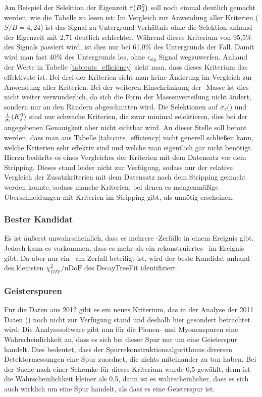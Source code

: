 Am Beispiel der Selektion der Eigenzeit $\tau(\text{$B_d^0$})$ soll noch einmal deutlich gemacht werden, wie die Tabelle zu lesen ist: Im Vergleich zur Anwendung aller Kriterien ($S/B=4,24$) ist das Signal-zu-Untergrund-Verhältnis ohne die Selektion anhand der Eigenzeit mit 2,71 deutlich schlechter. Während dieses Kriterium von 95,5\% des Signals passiert wird, ist dies nur bei 61,0\% des Untergrunds der Fall. Damit wird man fast 40\% des Untergrunds los, ohne $\epsilon_{\text{sig}}$ Signal wegzuwerfen. Anhand der Werte in Tabelle \ref{tab:cuts_efficiency} sieht man, dass dieses Kriterium das effektivste ist. Bei drei der Kriterien sieht man keine Änderung im Vergleich zur Anwendung aller Kriterien. Bei der weiteren Einschränkung der \Bd-Masse ist dies nicht weiter verwunderlich, da sich die Form der Massenverteilung nicht ändert, sondern nur an den Rändern abgeschnitten wird. Die Selektionen auf $\sigma_\tau($\Bd$)$ und $\frac{l}{\sigma_l}(K_s^0)$ sind nur schwache Kriterien, die zwar minimal selektieren, dies bei der angegebenen Genauigkeit aber nicht sichtbar wird. An dieser Stelle soll betont werden, dass man aus Tabelle \ref{tab:cuts_efficiency} nicht generell schließen kann, welche Kriterien sehr effektiv sind und welche man eigentlich gar nicht benötigt. Hierzu bedürfte es eines Vergleiches der Kriterien mit dem Datensatz vor dem Stripping. Dieses stand leider nicht zur Verfügung, sodass nur der relative Vergleich der Zusatzkriterien mit dem Datensatz nach dem Stripping gemacht werden konnte, sodass manche Kriterien, bei denen es mengenmäßige Überschneidungen mit Kriterien im Stripping gibt, als unnötig erscheinen.

\subsubsection{Bester Kandidat}
Es ist äußerst unwahrscheinlich, dass es mehrere \Decaychannel-Zerfälle in einem Ereignis gibt. Jedoch kann es vorkommen, dass es mehr als ein rekonstruiertes \Bd\ im Ereignis gibt. Da aber nur ein \Bd\ am Zerfall beteiligt ist, wird der beste Kandidat anhand des kleinsten $\chi^2_{DTF}/\text{nDoF}$ des DecayTreeFit identifiziert \cite{lhcb-paper}.

\subsubsection{Geisterspuren}
Für die Daten aus 2012 gibt es ein neues Kriterium, das in der Analyse der 2011 Daten (\cite{lhcb-paper}) noch nicht zur Verfügung stand und deshalb hier gesondert betrachtet wird: Die Analysesoftware gibt nun für die Pionen- und Myonenspuren eine Wahrscheinlichkeit an, dass es sich bei dieser Spur nur um eine Geisterspur handelt. Dies bedeutet, dass der Spurrekonstruktionsalgorithmus diversen Detektormessungen eine Spur zuordnet, die nichts miteinander zu tun haben. Bei der Suche nach einer Schranke für dieses Kriterium wurde 0,5 gewählt, denn ist die Wahrscheinlichkeit kleiner als 0,5, dann ist es wahrscheinlicher, dass es sich auch wirklich um eine Spur handelt, als dass es eine Geisterspur ist.

